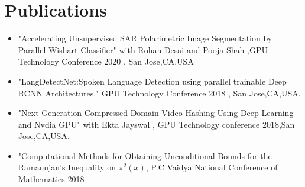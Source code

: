 \documentclass[]{deedy-resume-openfont}
\begin{document}
\section{Publications}
\hline
\vspace{\topsep}
\begin{itemize}
\item "Accelerating Unsupervised SAR Polarimetric Image Segmentation by Parallel Wishart Classifier" with Rohan Desai and
Pooja Shah ,GPU Technology Conference 2020 , San Jose,CA,USA

\item "LangDetectNet:Spoken Language Detection using parallel trainable Deep RCNN Architectures." GPU Technology Conference 2018 , San Jose,CA,USA.
\item "Next Generation Compressed Domain Video Hashing Using Deep Learning and Nvdia GPU" with Ekta Jayswal , GPU Technology conference 2018,San Jose,CA,USA.
\item "Computational Methods for Obtaining Unconditional Bounds for the Ramanujan’s Inequality on $\pi^2(x)$, P.C Vaidya National Conference of Mathematics 2018


\end{itemize}
\end{document}
